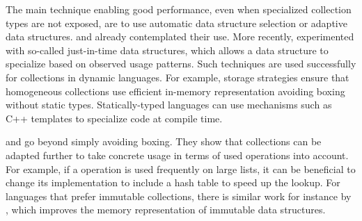 \documentclass[sigconf, authorversion]{acmart}
\begin{document}
The main technique enabling good performance,
even when specialized collection types are not exposed,
are to use automatic data structure selection or adaptive data structures.
\citet[sec. 2.3]{PeytonJones:1996:BTC} and \citet{Chuang:1996:PAP}
already contemplated their use.
More recently, \citet{DeWael:15:JitData} experimented
with so-called just-in-time data structures,
which allows a data structure to specialize
based on observed usage patterns.
Such techniques are used successfully
for collections in dynamic languages.
For example, storage strategies\citep{Bolz:2013:SSC,Clifford:2015:MMD} 
ensure that homogeneous collections use efficient in-memory representation
avoiding boxing without static types. 
Statically-typed languages can use mechanisms such as
C++ templates to specialize code at compile time.

\citet{Xu2013} and \citet{Costa:2018:CS} go beyond simply avoiding boxing.
They show that collections can be adapted further to take concrete usage
in terms of used operations into account.
For example, if a  operation is used frequently
on large lists, it can be beneficial to change its implementation to include
a hash table to speed up the lookup.
For languages that prefer immutable collections,
there is similar work for instance by \citet{Pape:2017:VC},
which improves the memory representation of immutable data structures.
\end{document}
